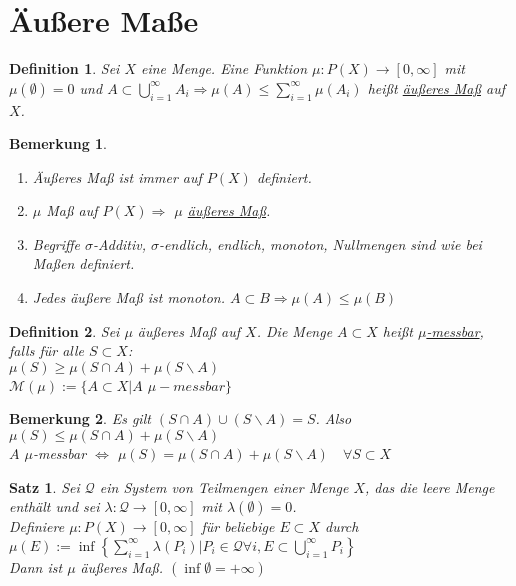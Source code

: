 \documentclass[11pt]{memoir}
\theoremstyle{changebreak}
\newtheorem{Definition}{Definition}[chapter]
\newtheorem{Bemerkung}{Bemerkung}[chapter]
\newtheorem{Satz}{Satz}[chapter]
\begin{document}
\section{Äußere Maße}

\begin{Definition}
Sei $X$ eine Menge. Eine Funktion $\mu: P(X) \rightarrow [0, \infty]$ mit $\mu(\emptyset) = 0$ und $A \subset \bigcup\limits_{i=1}^\infty A_i \Rightarrow \mu(A) \leq \sum\limits_{i=1}^\infty \mu(A_i)$ heißt \underline{äußeres Maß} auf $X$.
\end{Definition}

\begin{Bemerkung}
\begin{enumerate}
	\item Äußeres Maß ist immer auf $P(X)$ definiert.
	\item $\mu$ Maß auf $P(X) \Rightarrow$ $\mu$ \underline{äußeres Maß}.
	\item Begriffe $\sigma$-Additiv, $\sigma$-endlich, endlich, monoton, Nullmengen sind wie bei Maßen definiert.
	\item Jedes äußere Maß ist monoton. $A \subset B \Rightarrow \mu(A) \leq \mu(B)$
\end{enumerate}
\end{Bemerkung}

\begin{Definition}
Sei $\mu$ äußeres Maß auf $X$. Die Menge $A \subset X$ heißt \underline{$\mu$-messbar}, falls für alle $S \subset X$: \\
$\mu(S) \geq \mu(S \cap A) + \mu(S \backslash A)$ \\
$\mathscr M(\mu):= \{ A \subset X | A$ $ \mu-messbar \}$
\end{Definition}

\begin{Bemerkung}
Es gilt $(S \cap A) \cup (S \backslash A) = S$. Also $\mu(S) \leq \mu(S \cap A) + \mu(S \backslash A)$ \\
$A$ $\mu$-messbar $\Leftrightarrow$ $\mu(S) = \mu(S \cap A) + \mu(S \backslash A)\quad \forall S \subset X$
\end{Bemerkung}

\begin{Satz}
Sei $\mathscr Q$ ein System von Teilmengen einer Menge $X$, das die leere Menge enthält und sei $\lambda: \mathscr Q \rightarrow [0, \infty]$ mit $\lambda(\emptyset) = 0$.\\
Definiere $\mu: P(X) \rightarrow [0, \infty]$ für beliebige $E \subset X$ durch \\
 $\mu(E) := \inf \left\lbrace \sum\limits_{i=1}^\infty \lambda(P_i) | P_i \in \mathscr Q \forall i, E \subset \bigcup\limits_{i=1}^\infty P_i \right\rbrace$ \\
Dann ist $\mu$ äußeres Maß. $(\inf \emptyset = + \infty)$
\end{Satz}
\end{document}
